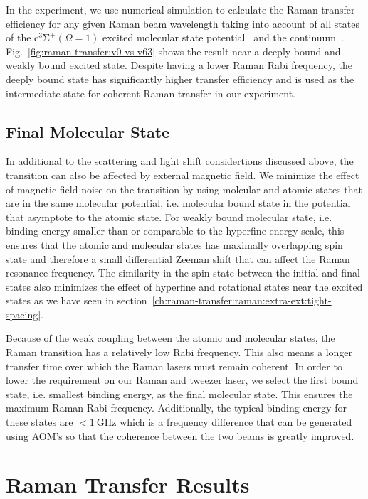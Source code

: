 In the experiment, we use numerical simulation to calculate the Raman transfer efficiency
for any given Raman beam wavelength taking into account of all states of
the $\mathrm{c^3\Sigma^+}(\Omega = 1)$
excited molecular state potential~\cite{grochola_spin-forbidden_2011}
and the continuum~\cite{liu_ultracold_2017}.
Fig.~\ref{fig:raman-transfer:v0-vs-v63} shows the result near a deeply bound
and weakly bound excited state.
Despite having a lower Raman Rabi frequency,
the deeply bound state has significantly higher transfer efficiency
and is used as the intermediate state for coherent Raman transfer in our experiment.

\subsection{Final Molecular State}
\label{ch:raman-transfer:state-selction:final}

In additional to the scattering and light shift considertions discussed above,
the transition can also be affected by external magnetic field.
We minimize the effect of magnetic field noise on the transition by using molcular
and atomic states that are in the same molecular potential,
i.e. molecular bound state in the potential that asymptote to
the atomic state. For weakly bound molecular state,
i.e. binding energy smaller than or comparable to the hyperfine energy scale,
this ensures that the atomic and molecular states has maximally overlapping spin state
and therefore a small differential Zeeman shift that can affect the Raman resonance frequency.
The similarity in the spin state between the initial and final states
also minimizes the effect of hyperfine and rotational states near the excited states
as we have seen in section~\ref{ch:raman-transfer:raman:extra-ext:tight-spacing}.

Because of the weak coupling between the atomic and molecular states,
the Raman transition has a relatively low Rabi frequency.
This also means a longer transfer time over which the Raman lasers must remain coherent.
In order to lower the requirement on our Raman and tweezer laser,
we select the first bound state, i.e. smallest binding energy, as the final molecular state.
This ensures the maximum Raman Rabi frequency.
Additionally, the typical binding energy for these states are $<1~\mathrm{GHz}$
which is a frequency difference that can be generated using AOM's
so that the coherence between the two beams is greatly improved.

\section{Raman Transfer Results}
\label{ch:raman-transfer:results}

